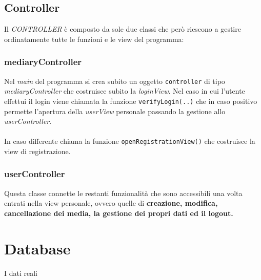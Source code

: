 \documentclass[10pt,a4paper,openany]{article}
\begin{document}
	\newpage
	
		\subsection{Controller}
		
		Il \emph{CONTROLLER} è composto da sole due classi che però riescono a gestire ordinatamente tutte le funzioni e le view del programma:
		
			\subsubsection{mediaryController}
			
			Nel \emph{main} del programma si crea subito un oggetto \texttt{controller} di tipo \emph{mediaryController} che costruisce subito la 
			\emph{loginView}.
			Nel caso in cui l'utente effettui il login viene chiamata la funzione \texttt{verifyLogin(..)} che in caso positivo permette l'apertura della \emph{userView}
			personale passando la gestione allo \emph{userController}.\\\\
			In caso differente chiama la funzione \texttt{openRegistrationView()} che costruisce la view di registrazione.
			
			\subsubsection{userController}
			
			Questa classe connette le restanti funzionalità che sono accessibili una volta entrati nella view personale, ovvero quelle di \textbf{creazione, modifica, 
			cancellazione dei media, la gestione dei propri dati ed il logout.}
			
\section{Database}

\newpage

I dati reali 







	





\end{document}
